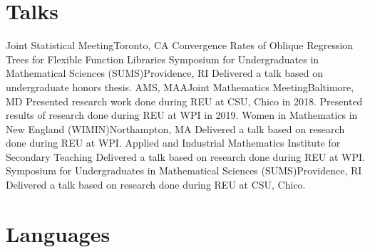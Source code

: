 \documentclass[10pt,a4paper,roman]{moderncv}        %
\begin{document}
\section{Talks}
{Joint Statistical Meeting}{Toronto, CA}
{}{Convergence Rates of Oblique Regression Trees for Flexible Function Libraries}
{Symposium for Undergraduates in Mathematical Sciences (SUMS)}{Providence, RI}
{}{Delivered a talk based on undergraduate honors thesis.}
{AMS, MAA}{Joint Mathematics Meeting}{Baltimore, MD}
{}{Presented research work done during REU at CSU, Chico in 2018.
  Presented results of research done during REU at WPI in 2019.}
{Women in Mathematics in New England (WIMIN)}{Northampton, MA}
{}{Delivered a talk based on research done during REU at WPI.}
{Applied and Industrial Mathematics Institute for Secondary Teaching}
{Delivered a talk based on research done during REU at WPI.}
{Symposium for Undergraduates in Mathematical Sciences (SUMS)}{Providence, RI}
{}{Delivered a talk based on research done during REU at CSU, Chico.}

\section{Languages}
\begin{cvcolumns}
\end{cvcolumns}

\clearpage
\end{document}
